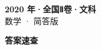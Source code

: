 \documentclass[zihao=-4, a4paper]{ctexart}
\begin{document}
\begin{center}
  {\Large\bfseries 2020 年·全国Ⅱ卷·文科}\\[4pt]
  {\large 数学 · 简答版}
\end{center}
\medskip
{}

\clearpage
{}
\begin{center}{\Large\bfseries 答案速查}\end{center}
\medskip

\end{document}
